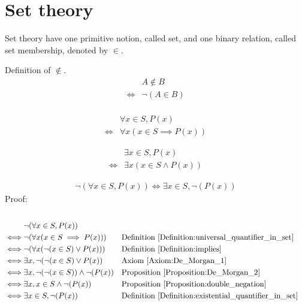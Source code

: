 \chapter{Set theory}
Set theory have one primitive notion, called set, and one binary relation, called set membership, denoted by $\in$.

\begin{defn}
\label{Definition:notin}
Definition of $\notin$.
\begin{align*}
& A \notin B \\
\iff & \lnot (A \in B) \\
\end{align*}
\end{defn}

\begin{defn}
\label{Definition:universal_quantifier_in_set}
\begin{align*}
& \forall x \in S, P(x) \\
\iff & \forall x (x \in S \implies P(x))
\end{align*}
\end{defn}

\begin{defn}
\label{Definition:existential_quantifier_in_set}
\begin{align*}
& \exists x \in S, P(x) \\
\iff & \exists x (x \in S \land P(x))
\end{align*}
\end{defn}

\begin{prop}
\begin{align*}
\lnot (\forall x \in S, P(x)) \iff \exists x \in S, \lnot (P(x))
\end{align*} 
Proof: \\ \\
\begin{align*}
& \lnot (\forall x \in S, P(x)) \\
\iff & \lnot ( \forall x (x \in S \implies P(x)) )
&& \text{Definition \ref{Definition:universal_quantifier_in_set}} \\
\iff & \lnot ( \forall x (\lnot(x \in S) \lor P(x)) )
&& \text{Definition \ref{Definition:implies}} \\
\iff & \exists x, \lnot (\lnot(x \in S) \lor P(x))
&& \text{Axiom \ref{Axiom:De_Morgan_1}} \\
\iff & \exists x, \lnot (\lnot(x \in S)) \land \lnot (P(x))
&& \text{Proposition \ref{Proposition:De_Morgan_2}} \\
\iff & \exists x, x \in S \land \lnot (P(x))
&& \text{Proposition \ref{Proposition:double_negation}} \\
\iff & \exists x \in S, \lnot (P(x))
&& \text{Definition \ref{Definition:existential_quantifier_in_set}} \\
\end{align*}
\end{prop}


